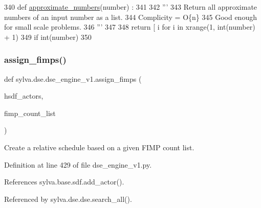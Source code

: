 \begin{DoxyCode}
340 \textcolor{keyword}{def }\hyperlink{namespacesylva_1_1dse_1_1dse__engine__v1_ad6e97d4396aee376d84b0ce79ba7fd22}{approximate\_numbers}(number) :
341 
342   \textcolor{stringliteral}{'''}
343 \textcolor{stringliteral}{    Return all approximate numbers of an input number as a list.}
344 \textcolor{stringliteral}{    Complicity = O\{n\}}
345 \textcolor{stringliteral}{    Good enough for small scale problems.}
346 \textcolor{stringliteral}{  '''}
347 
348   \textcolor{keywordflow}{return} [ i \textcolor{keywordflow}{for} i \textcolor{keywordflow}{in} xrange(1, int(number) + 1)
349            \textcolor{keywordflow}{if} int(number) %
350 
\end{DoxyCode}
\mbox{\label{namespacesylva_1_1dse_1_1dse__engine__v1_ac7bc9055c7171c3d5156f342722248fc}} 
\subsubsection{\texorpdfstring{assign\+\_\+fimps()}{assign\_fimps()}}
{\footnotesize\ttfamily def sylva.\+dse.\+dse\+\_\+engine\+\_\+v1.\+assign\+\_\+fimps (\begin{DoxyParamCaption}\item[{}]{hsdf\+\_\+actors,  }\item[{}]{fimp\+\_\+count\+\_\+list }\end{DoxyParamCaption})}

\begin{DoxyVerb}  Create a relative schedule based on a given FIMP count list.
\end{DoxyVerb}
 

Definition at line 429 of file dse\+\_\+engine\+\_\+v1.\+py.



References sylva.\+base.\+sdf.\+add\+\_\+actor().



Referenced by sylva.\+dse.\+dse.\+search\+\_\+all().


